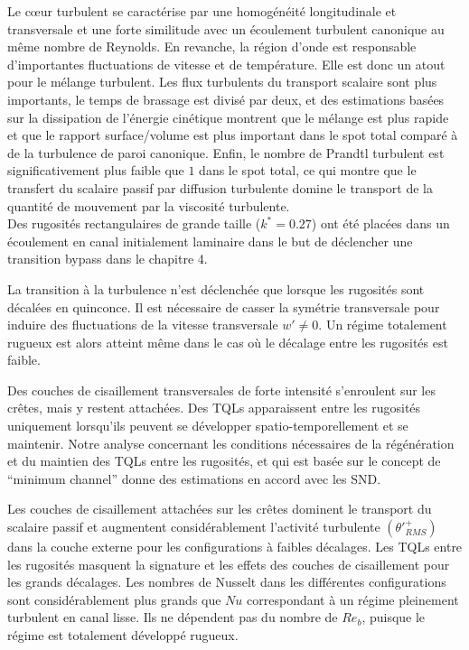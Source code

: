 Le cœur turbulent se caractérise par une homogénéité longitudinale et transversale et une forte similitude avec un écoulement turbulent canonique au même nombre de Reynolds. En revanche, la région d'onde est responsable d'importantes fluctuations de vitesse et de température. Elle est donc un atout pour le mélange turbulent. Les flux turbulents du transport scalaire sont plus importants, le temps de brassage est divisé par deux, et des estimations basées sur la dissipation de l'énergie cinétique montrent que le mélange est plus rapide et que le rapport surface/volume est plus important dans le spot total comparé à de la turbulence de paroi canonique. Enfin, le nombre de Prandtl turbulent est significativement plus faible que $1$ dans le spot total, ce qui montre que le transfert du scalaire passif par diffusion turbulente domine le transport de la quantité de mouvement par la viscosité turbulente.\\

\vspace{3cm}
Des rugosités rectangulaires de grande taille ($k^{*}=0.27$) ont été placées dans un écoulement en canal initialement laminaire dans le but de déclencher une transition bypass dans le chapitre 4. 

La transition à la turbulence n'est déclenchée que lorsque les rugosités sont décalées en quinconce. Il est nécessaire de casser la symétrie transversale pour induire des fluctuations de la vitesse transversale $w' \ne 0$. Un régime totalement rugueux est alors atteint même dans le cas où le décalage entre les rugosités est faible. 

Des couches de cisaillement transversales de forte intensité s'enroulent sur les crêtes, mais y restent attachées. Des TQLs apparaissent entre les rugosités uniquement lorsqu’ils peuvent se développer spatio-temporellement et se maintenir. Notre analyse concernant les conditions nécessaires de la régénération et du maintien des TQLs entre les rugosités, et qui est basée sur le concept de \foreignquote{french}{minimum channel} donne des estimations en accord avec les SND. 

Les couches de cisaillement attachées sur les crêtes dominent le transport du scalaire passif et augmentent considérablement l'activité turbulente $\left( \theta'^{+}_{RMS} \right)$ dans la couche externe pour les configurations à faibles décalages. Les TQLs entre les rugosités masquent la signature et les effets des couches de cisaillement pour les grands décalages. Les nombres de Nusselt dans les différentes configurations sont considérablement plus grands que $Nu$ correspondant à un régime pleinement turbulent en canal lisse. Ils ne dépendent pas du nombre de $Re_{b}$, puisque le régime est totalement développé rugueux.\\

